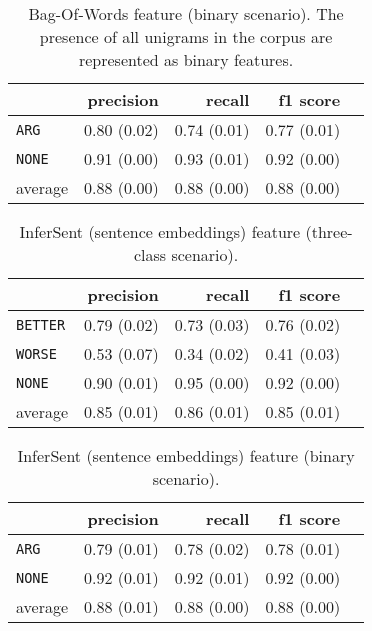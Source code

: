	
	\begin{table}[h] 
		\centering 
		\caption{Bag-Of-Words feature (binary scenario). The presence of all unigrams in the corpus are represented as binary features.} 
		\label{  }
		\begin{tabular}{@{}lrrrr@{}}
			\toprule
			        & precision                & recall                   & f1 score                 \\ \midrule 
			\texttt{ARG}     & 0.80 \scriptsize{(0.02)} & 0.74 \scriptsize{(0.01)} & 0.77 \scriptsize{(0.01)} \\ 
			\texttt{NONE}    & 0.91 \scriptsize{(0.00)} & 0.93 \scriptsize{(0.01)} & 0.92 \scriptsize{(0.00)} \\ 
			average & 0.88 \scriptsize{(0.00)} & 0.88 \scriptsize{(0.00)} & 0.88 \scriptsize{(0.00)} \\ 
			\bottomrule
		\end{tabular}
	\end{table}
	
	
	
	\begin{table}[h] 
		\centering 
		\caption{InferSent (sentence embeddings) feature (three-class scenario).} 
		\label{  }
		\begin{tabular}{@{}lrrrr@{}}
			\toprule
			        & precision                & recall                   & f1 score                 \\ \midrule 
			\texttt{BETTER}  & 0.79 \scriptsize{(0.02)} & 0.73 \scriptsize{(0.03)} & 0.76 \scriptsize{(0.02)} \\ 
			\texttt{WORSE}   & 0.53 \scriptsize{(0.07)} & 0.34 \scriptsize{(0.02)} & 0.41 \scriptsize{(0.03)} \\ 
			\texttt{NONE}    & 0.90 \scriptsize{(0.01)} & 0.95 \scriptsize{(0.00)} & 0.92 \scriptsize{(0.00)} \\ 
			average & 0.85 \scriptsize{(0.01)} & 0.86 \scriptsize{(0.01)} & 0.85 \scriptsize{(0.01)} \\ 
			\bottomrule
		\end{tabular}
	\end{table}
	
	\begin{table}[h] 
		\centering 
		\caption{InferSent (sentence embeddings) feature (binary scenario).} 
		\label{  }
		\begin{tabular}{@{}lrrrr@{}}
			\toprule
			        & precision                & recall                   & f1 score                 \\ \midrule 
			\texttt{ARG}     & 0.79 \scriptsize{(0.01)} & 0.78 \scriptsize{(0.02)} & 0.78 \scriptsize{(0.01)} \\ 
			\texttt{NONE}    & 0.92 \scriptsize{(0.01)} & 0.92 \scriptsize{(0.01)} & 0.92 \scriptsize{(0.00)} \\ 
			average & 0.88 \scriptsize{(0.01)} & 0.88 \scriptsize{(0.00)} & 0.88 \scriptsize{(0.00)} \\ 
			\bottomrule
		\end{tabular}
	\end{table}
	
